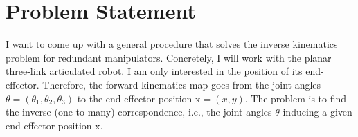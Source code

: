 \section{Problem Statement}
%
%
I want to come up with a general procedure that solves the inverse kinematics
problem for redundant manipulators. Concretely, I will work with the planar
three-link articulated robot. I am only interested in the position of its
end-effector. Therefore, the forward kinematics map goes from the joint angles
$\theta = (\theta_1, \theta_2, \theta_3)$ to the end-effector position
$\mathrm{x} = (x,y)$. The problem is to find the inverse (one-to-many)
correspondence, i.e., the joint angles $\theta$ inducing a given end-effector
position $\mathrm{x}$.